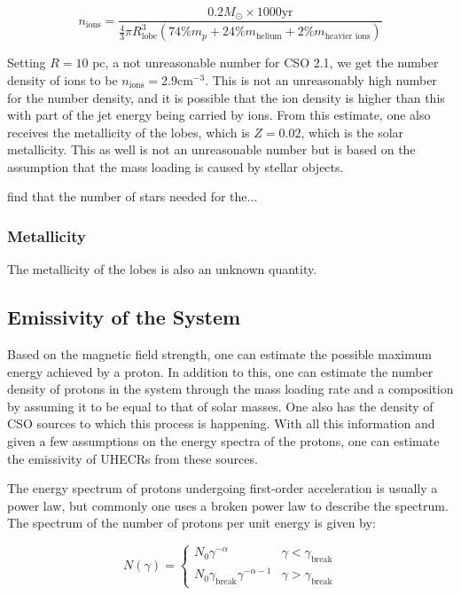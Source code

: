 \begin{equation}
    n_{\text{ions}} = \frac{0.2 M_{\odot}\times 1000 \text{yr}}{\frac{4}{3} \pi R_{\text{lobe}}^3 (74\%m_p+24\%m_{\text{helium}}+2\%m_{\text{heavier ions}})}
\end{equation}

Setting $R = 10$ pc, a not unreasonable number for CSO 2.1, we get the number density of ions to be $n_{\text{ions}} = 2.9  \text{cm}^{-3}$. This is not an unreasonably high number for the number density, and it is possible that the ion density is higher than this with part of the jet energy being carried by ions. From this estimate, one also receives the metallicity of the lobes, which is $Z = 0.02$, which is the solar metallicity. This as well is not an unreasonable number but is based on the assumption that the mass loading is caused by stellar objects.

\cite{sullivan2024smallscale} find that the number of stars needed for the...

\subsubsection{Metallicity}
The metallicity of the lobes is also an unknown quantity.

\subsection{Emissivity of the System}
Based on the magnetic field strength, one can estimate the possible maximum energy achieved by a proton. In addition to this, one can estimate the number density of protons in the system through the mass loading rate and a composition by assuming it to be equal to that of solar masses. One also has the density of CSO sources to which this process is happening. With all this information and given a few assumptions on the energy spectra of the protons, one can estimate the emissivity of UHECRs from these sources.

The energy spectrum of protons undergoing first-order acceleration is usually a power law, but commonly one uses a broken power law to describe the spectrum. The spectrum of the number of protons per unit energy is given by:

\begin{equation}
    \label{eq:proton_spectrum}
    N(\gamma) = \begin{cases}
    N_0 \gamma^{-\alpha} & \gamma < \gamma_{\text{break}} \\
    N_0 \gamma_{\text{break}}\gamma^{-\alpha-1} & \gamma > \gamma_{\text{break}}
    \end{cases}
\end{equation}

